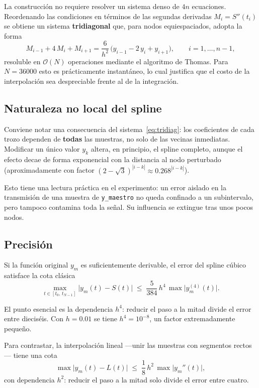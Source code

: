 \documentclass[12pt,a4paper]{article}
\begin{document}
La construcción no requiere resolver un sistema denso de $4n$ ecuaciones. Reordenando las condiciones en términos de las segundas derivadas $M_i = S''(t_i)$ se obtiene un sistema \textbf{tridiagonal} que, para nodos equiespaciados, adopta la forma
\begin{equation}
M_{i-1} + 4\,M_i + M_{i+1} = \frac{6}{h^2}\,\bigl(y_{i-1} - 2\,y_i + y_{i+1}\bigr),
\qquad i = 1,\dots,n-1,
\label{eq:tridiag}
\end{equation}
resoluble en $\mathcal{O}(N)$ operaciones mediante el algoritmo de Thomas. Para $N = 36000$ esto es prácticamente instantáneo, lo cual justifica que el costo de la interpolación sea despreciable frente al de la integración.

\subsection{Naturaleza no local del spline}

Conviene notar una consecuencia del sistema~\eqref{eq:tridiag}: los coeficientes de cada trozo dependen de \textbf{todas} las muestras, no solo de las vecinas inmediatas. Modificar un único valor $y_k$ altera, en principio, el spline completo, aunque el efecto decae de forma exponencial con la distancia al nodo perturbado (aproximadamente con factor $(2-\sqrt{3})^{|i-k|} \approx 0.268^{|i-k|}$).

Esto tiene una lectura práctica en el experimento: un error aislado en la transmisión de una muestra de \texttt{y\_maestro} no queda confinado a un subintervalo, pero tampoco contamina toda la señal. Su influencia se extingue tras unos pocos nodos.

\subsection{Precisión}

Si la función original $y_m$ es suficientemente derivable, el error del spline cúbico satisface la cota clásica
\begin{equation}
\max_{t \in [t_0,\, t_{N-1}]} \bigl|y_m(t) - S(t)\bigr| \;\leq\; \frac{5}{384}\,h^4\,\max\bigl|y_m^{(4)}(t)\bigr|.
\label{eq:cotacubica}
\end{equation}

El punto esencial es la dependencia $h^4$: reducir el paso a la mitad divide el error entre dieciséis. Con $h = 0.01$ se tiene $h^4 = 10^{-8}$, un factor extremadamente pequeño.

Para contrastar, la interpolación lineal —unir las muestras con segmentos rectos— tiene una cota
\begin{equation}
\max\bigl|y_m(t) - L(t)\bigr| \;\leq\; \frac{1}{8}\,h^2\,\max\bigl|y_m''(t)\bigr|,
\label{eq:cotalineal}
\end{equation}
con dependencia $h^2$: reducir el paso a la mitad solo divide el error entre cuatro.
\end{document}
